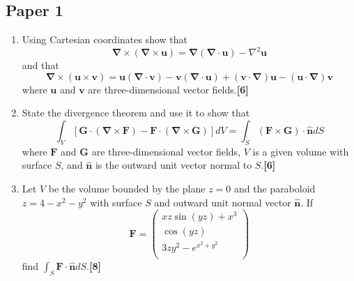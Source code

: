 \documentclass[a4paper]{article}
\begin{document}
\subsection{Paper 1}
\begin{qns}\leavevmode
\begin{enumerate}[label=(\roman*)]
    \item  Using Cartesian coordinates show that
$$\boldsymbol{\nabla}\times(\boldsymbol{\nabla}\times\mathbf{u})=\boldsymbol{\nabla}(\boldsymbol{\nabla}\cdot\mathbf{u})-\nabla^2\mathbf{u}$$
and that
$$\boldsymbol{\nabla}\times(\mathbf{u}\times\mathbf{v})=\mathbf{u}(\boldsymbol{\nabla}\cdot\mathbf{v})-\mathbf{v}(\boldsymbol{\nabla}\cdot\mathbf{u})+(\mathbf{v}\cdot\boldsymbol{\nabla})\mathbf{u}-(\mathbf{u}\cdot\boldsymbol{\nabla})\mathbf{v}$$
where $\mathbf{u}$ and $\mathbf{v}$ are three-dimensional vector fields.\hfill \textbf{[6]}
\item State the divergence theorem and use it to show that
$$\int_V[\mathbf{G}\cdot(\boldsymbol{\nabla}\times\mathbf{F})-\mathbf{F}\cdot(\boldsymbol{\nabla}\times\mathbf{G})]dV=\int_S(\mathbf{F}\times\mathbf{G})\cdot\mathbf{\hat{n}}dS$$
where $\mathbf{F}$ and $\mathbf{G}$ are three-dimensional vector fields, $V$ is a given volume with surface $S$, and $\mathbf{\hat{n}}$ is the outward unit vector normal to $S$.\hfill \textbf{[6]}
\item Let $V$ be the volume bounded by the plane $z = 0$ and the paraboloid $z = 4−x^2−y^2$ with surface $S$ and outward unit normal vector $\mathbf{\hat{n}}$. If
$$\mathbf{F}=\begin{pmatrix}xz\sin(yz)+x^3\\\cos(yz)\\3zy^2-e^{x^2+y^2}\\\end{pmatrix}$$
find $\int_S\mathbf{F}\cdot\mathbf{\hat{n}}dS$.\hfill \textbf{[8]}
\end{enumerate}
\end{qns}
\end{document}
